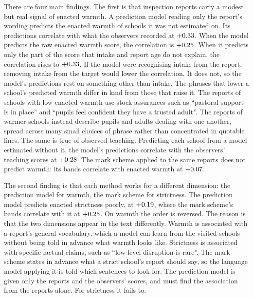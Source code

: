 There are four main findings. The first is that inspection reports
carry a modest but real signal of enacted warmth. A prediction model reading only the report's wording predicts the enacted warmth of schools it was not estimated on. Its predictions correlate with what the observers recorded at $+0.33$. When the model predicts the raw enacted warmth score, the correlation is $+0.25$. When it predicts only the part of the score that intake and report age do not explain, the correlation rises to $+0.33$. If the model were recognising intake from the report, removing intake from the target would lower the correlation. It does not, so the model's predictions rest on something other than intake. The phrases that lower a school's predicted warmth differ in kind from those that raise it. The reports of schools with low enacted warmth use stock assurances such as ``pastoral support is in place'' and ``pupils feel confident they have a trusted adult''. The reports of warmer schools instead describe pupils and adults
dealing with one another, spread across many small choices of phrase
rather than concentrated in quotable lines. The same is true of observed teaching. Predicting each school from a model estimated without it, the model's predictions correlate with the observers' teaching scores at $+0.28$. The mark scheme applied to the same reports does not predict warmth: its bands correlate with enacted warmth at $-0.07$.

The second finding is that each method works for a different dimension: the prediction model for warmth, the mark scheme for strictness. The prediction model predicts enacted strictness poorly, at $+0.19$, where the mark scheme's bands correlate with it at $+0.25$. On warmth the order is reversed. The reason is that the two dimensions appear in the text differently. Warmth is associated with a report's general vocabulary, which a model can learn from the visited schools without being told in advance what warmth looks like. Strictness is associated with specific factual claims, such as ``low-level disruption is rare''. The mark scheme states in advance what a strict school's report should say, so the language model applying it is told which sentences to look for. The prediction model is given only the reports and the observers' scores, and must find the association from the reports alone. For strictness it fails to.

